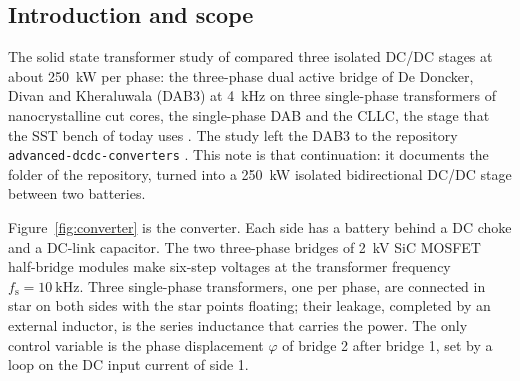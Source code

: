 \documentclass[12pt,a4paper]{scrartcl}
\newcommand{\ped}[1]{_{\mathrm{#1}}}
\newcommand{\code}[1]{\texttt{#1}}
\begin{document}
\begin{onehalfspace}
\section{Introduction and scope}
\label{sec:intro}

The solid state transformer study of \cite{sst_doc} compared three isolated DC/DC stages at about \SI{250}{\kilo\watt} per phase: the three-phase dual active bridge of De Doncker, Divan and Kheraluwala \cite{dedoncker1991} (DAB3) at \SI{4}{\kilo\hertz} on three single-phase transformers of nanocrystalline cut cores, the single-phase DAB and the CLLC, the stage that the SST bench of today uses \cite{cllc_doc}. The study left the DAB3 to the repository \code{advanced-dcdc-converters} \cite{dcdc_repo}. This note is that continuation: it documents the folder  of the repository, turned into a \SI{250}{\kilo\watt} isolated bidirectional DC/DC stage between two batteries.

Figure~\ref{fig:converter} is the converter. Each side has a battery behind a DC choke and a DC-link capacitor. The two three-phase bridges of \SI{2}{\kilo\volt} SiC MOSFET half-bridge modules make six-step voltages at the transformer frequency $f\ped{s} = \SI{10}{\kilo\hertz}$. Three single-phase transformers, one per phase, are connected in star on both sides with the star points floating; their leakage, completed by an external inductor, is the series inductance that carries the power. The only control variable is the phase displacement $\varphi$ of bridge 2 after bridge 1, set by a loop on the DC input current of side 1.


\end{onehalfspace}
\end{document}
